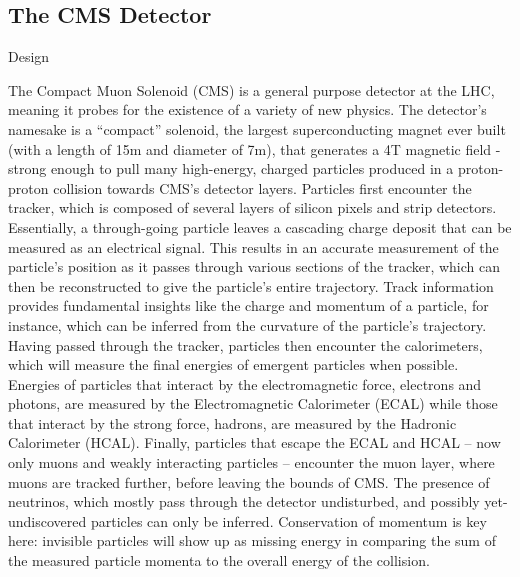 \documentclass[oneside,12pt,final]{sty/ucthesis-CA2012}
\begin{document}
\begin{mainmatter}
\chapter{The CMS Detector}{\label{appendix:a}}
\begin{section}{Design}

The Compact Muon Solenoid (CMS) is a general purpose detector at the LHC, meaning it probes for the existence of a variety of new physics. The detector's namesake is a ``compact'' solenoid, the largest superconducting magnet ever built (with a length of 15m and diameter of 7m\cite{CMS:1994hea}), that generates a 4T magnetic field - strong enough to pull many high-energy, charged particles produced in a proton-proton collision towards CMS's detector layers. Particles first encounter the tracker, which is composed of several layers of silicon pixels and strip detectors. Essentially, a through-going particle leaves a cascading charge deposit that can be measured as an electrical signal. This results in an accurate measurement of the particle's position as it passes through various sections of the tracker, which can then be reconstructed to give the particle's entire trajectory. Track information provides fundamental insights like the charge and momentum of a particle, for instance, which can be inferred from the curvature of the particle's trajectory. Having passed through the tracker, particles then encounter the calorimeters, which will measure the final energies of emergent particles when possible. Energies of particles that interact by the electromagnetic force, electrons and photons, are measured by the Electromagnetic Calorimeter (ECAL) while those that interact by the strong force, hadrons, are measured by the Hadronic Calorimeter (HCAL). Finally, particles that escape the ECAL and HCAL -- now only muons and weakly interacting particles -- encounter the muon layer, where muons are tracked further, before leaving the bounds of CMS. The presence of neutrinos, which mostly pass through the detector undisturbed, and possibly yet-undiscovered particles can only be inferred. Conservation of momentum is key here: invisible particles will show up as missing energy in comparing the sum of the measured particle momenta to the overall energy of the collision.


\end{section}
\end{mainmatter}
\end{document}
